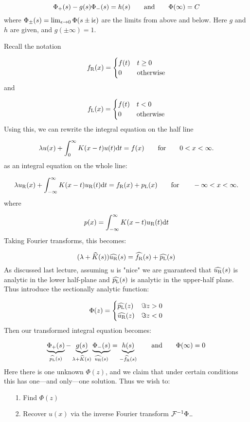 \documentclass[12pt,a4paper]{article}
\def\qqand{\qquad\hbox{and}\qquad}
\def\qqfor{\qquad\hbox{for}\qquad}
\def\D{ {\rm d} }
\def\I{ {\rm i} }
\def\dt{\D t}
\def\emdash{—}
\begin{document}
\[
\Phi_+(s) - g(s)\Phi_-(s) = h(s) \qqand \Phi(\infty) = C
\]
where $\Phi_\pm(s) = \lim_{\epsilon \rightarrow 0} \Phi(s \pm \I \epsilon)$ are the limits from above and below.  Here $g$ and $h$ are given, and $g(\pm \infty) = 1$.

Recall the notation

\[
f_{\rm R}(x) = \begin{cases}f(t) & t \geq 0 \\ 0 & \hbox{otherwise} \end{cases}
\]
and

\[
f_{\rm L}(x) = \begin{cases}f(t) & t < 0 \\ 0 & \hbox{otherwise} \end{cases}
\]
Using this, we can rewrite the integral equation on the half line

\[
\lambda u(x) + \int_{0}^\infty K(x-t)u(t) \dt = f(x)\qqfor 0 < x < \infty.
\]
as an integral equation on the whole line:

\[
\lambda u_{\rm R}(x) + \int_{-\infty}^\infty K(x-t)u_{\rm R}(t) \dt = f_{\rm R}(x) + p_{\rm L}(x)\qqfor -\infty < x < \infty.
\]
where

\[
p(x) = \int_{-\infty}^\infty K(x-t)u_{\rm R}(t) \dt
\]
Taking Fourier transforms, this becomes:

\[
(\lambda + \widehat K(s)) \widehat{u_{\rm R}}(s) = \widehat{f_{\rm R}}(s) + \widehat{p_{\rm L}}(s)
\]
As discussed last lecture, assuming $u$ is "nice" we are guaranteed that $\widehat{ u_{\rm R}}(s)$ is analytic in the lower half-plane and $\widehat{ p_{\rm L}}(s)$ is analytic in the upper-half plane. Thus introduce the sectionally analytic function:

\[
\Phi(z) = \begin{cases}  \widehat{p_{\rm L}}(z) & \Im z > 0 \\
                            \widehat{u_{\rm R}}(z) & \Im z < 0
                            \end{cases}
\]
Then our transformed integral equation becomes:

\[
\underbrace{\Phi_+(s)}_{\widehat{p_{\rm L}}(s)} - \underbrace{g(s)}_{\lambda + \widehat K(s)} \underbrace{\Phi_-(s)}_{\widehat{u_{\rm R}}(s)} = \underbrace{h(s)}_{-\widehat{f_{\rm R}}(s) } \qqand \Phi(\infty) = 0
\]
Here there is one unknown $\Phi(z)$, and we claim that under certain conditions this has one\ensuremath{\emdash}and only\ensuremath{\emdash}one solution. Thus we wish to:

\begin{itemize}
\item[1. ] Find $\Phi(z)$


\item[2. ] Recover $u(x)$ via the inverse Fourier transform ${\cal F}^{-1} \Phi_-$

\end{itemize}
\end{document}
